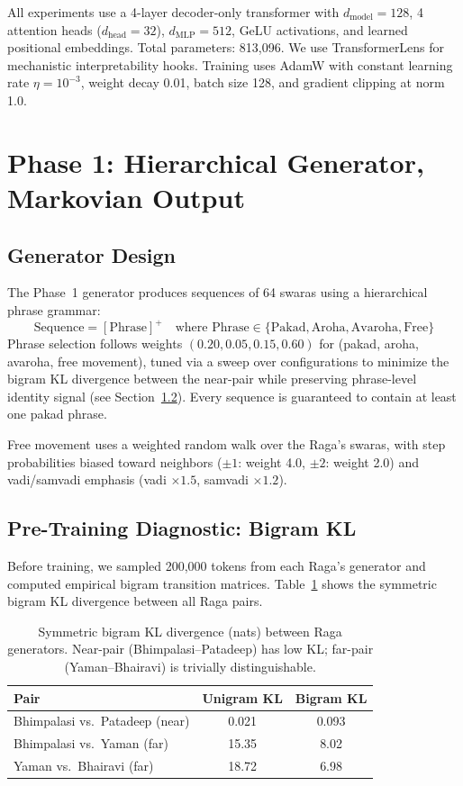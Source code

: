 \documentclass[11pt,a4paper]{article}
\begin{document}
All experiments use a 4-layer decoder-only transformer with $d_\text{model} = 128$, 4 attention heads ($d_\text{head} = 32$), $d_\text{MLP} = 512$, GeLU activations, and learned positional embeddings. Total parameters: 813,096. We use TransformerLens \citep{nanda2022transformerlens} for mechanistic interpretability hooks. Training uses AdamW with constant learning rate $\eta = 10^{-3}$, weight decay 0.01, batch size 128, and gradient clipping at norm 1.0.

\section{Phase 1: Hierarchical Generator, Markovian Output}

\subsection{Generator Design}

The Phase~1 generator produces sequences of 64 swaras using a hierarchical phrase grammar:
\begin{equation*}
    \text{Sequence} = [\text{Phrase}]^+ \quad \text{where Phrase} \in \{\text{Pakad}, \text{Aroha}, \text{Avaroha}, \text{Free}\}
\end{equation*}
Phrase selection follows weights $(0.20, 0.05, 0.15, 0.60)$ for (pakad, aroha, avaroha, free movement), tuned via a sweep over configurations to minimize the bigram KL divergence between the near-pair while preserving phrase-level identity signal (see Section~\ref{sec:bigram_kl}). Every sequence is guaranteed to contain at least one pakad phrase.

Free movement uses a weighted random walk over the Raga's swaras, with step probabilities biased toward neighbors ($\pm 1$: weight 4.0, $\pm 2$: weight 2.0) and vadi/samvadi emphasis (vadi $\times 1.5$, samvadi $\times 1.2$).

\subsection{Pre-Training Diagnostic: Bigram KL}
\label{sec:bigram_kl}

Before training, we sampled 200,000 tokens from each Raga's generator and computed empirical bigram transition matrices. Table~\ref{tab:bigram_kl} shows the symmetric bigram KL divergence between all Raga pairs.

\begin{table}[H]
\centering
\caption{Symmetric bigram KL divergence (nats) between Raga generators. Near-pair (Bhimpalasi--Patadeep) has low KL; far-pair (Yaman--Bhairavi) is trivially distinguishable.}
\label{tab:bigram_kl}
\begin{tabular}{lcc}
\toprule
Pair & Unigram KL & Bigram KL \\
\midrule
Bhimpalasi vs.\ Patadeep (near) & 0.021 & 0.093 \\
Bhimpalasi vs.\ Yaman (far) & 15.35 & 8.02 \\
Yaman vs.\ Bhairavi (far) & 18.72 & 6.98 \\
\bottomrule
\end{tabular}
\end{table}
\end{document}
